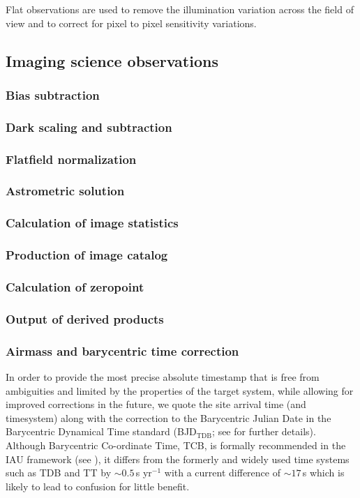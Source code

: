 \documentclass[twoside,11pt]{article}
\renewcommand{\_}{\texttt{\symbol{95}}}
\newcommand{\rmn}[1] {\mathrm{#1}}
\begin{document}
Flat observations are used to remove the illumination variation across the field
of view and to correct for pixel to pixel sensitivity variations.

\subsection{Imaging science observations}

\subsubsection{Bias subtraction}
\subsubsection{Dark scaling and subtraction}
\subsubsection{Flatfield normalization}
\subsubsection{Astrometric solution}
\subsubsection{Calculation of image statistics}
\subsubsection{Production of image catalog}
\subsubsection{Calculation of zeropoint}
\subsubsection{Output of derived products}
\subsubsection{Airmass and barycentric time correction}


In order to provide the most precise absolute timestamp that is free from
ambiguities and limited by the properties of the target system, while allowing
for improved corrections in the future, we quote the site arrival time (and
timesystem) along with the correction to the Barycentric Julian Date in the
Barycentric Dynamical Time standard (BJD$_\rmn{TDB}$; see \cite{eastman2010} for
further details). Although Barycentric Co-ordinate Time, TCB, is formally
recommended in the IAU framework (see \cite{iers2010}), it differs from the
formerly and widely used time systems such as TDB and TT by
$\sim0.5$\,s yr$^{-1}$ with a current difference of $\sim17$\,s which is likely to
lead to confusion for little benefit.
\end{document}
